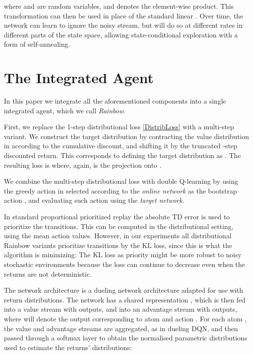 \documentclass[letterpaper]{article} \usepackage{aaai18}  \usepackage{times}  \usepackage{helvet}  \usepackage{courier}  \usepackage{url}  \usepackage{graphicx}  \usepackage{amsmath,amssymb}
\begin{document}
\noindent where  and  are random variables, and  denotes the element-wise product. This transformation can then be used in place of the standard linear . Over time, the network can learn to ignore the noisy stream, but will do so at different rates in different parts of the state space, allowing state-conditional exploration with a form of self-annealing. 

\section{The Integrated Agent} \label{KS}

In this paper we integrate all the aforementioned components into a single integrated agent, which we call \textit{Rainbow}.

First, we replace the 1-step distributional loss \eqref{DistribLoss} with a multi-step variant. We construct the target distribution by contracting the value distribution in  according to the cumulative discount, and shifting it by the truncated -step discounted return. This corresponds to defining the target distribution as . The resulting loss is
  where, again,  is the projection onto .

We combine the multi-step distributional loss with double Q-learning by
using the greedy action in  selected according to the \emph{online network} as the bootstrap action , and evaluating such action using the \emph{target network}.

In standard proportional prioritized replay \cite{schaul2015prioritized} the absolute TD error is used to prioritize the transitions. This can be computed in the distributional setting, using the mean action values. However, in our experiments all distributional Rainbow variants prioritize transitions by the KL loss, since this is what the algorithm is minimizing:
  The KL loss as priority might be more robust to noisy stochastic environments because the loss can continue to decrease even when the returns are not deterministic.

The network architecture is a dueling network architecture adapted for use with return distributions. The network has a shared representation , which is then fed into a value stream  with  outputs, and into an advantage stream  with  outputs, where  will denote the output corresponding to atom  and action .  For each atom , the value and advantage streams are aggregated, as in dueling DQN, and then passed through a softmax layer to obtain the normalised parametric distributions used to estimate the returns' distributions:
\end{document}
